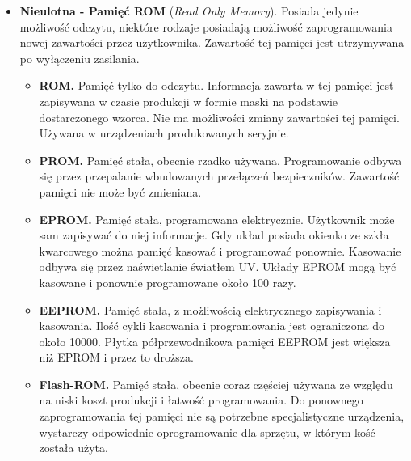 \documentclass[12pt,a4paper]{article}
\begin{document}
		\begin{itemize}
		\item \textbf{Nieulotna - Pamięć ROM} (\textit{Read Only Memory}). Posiada jedynie możliwość odczytu, niektóre rodzaje posiadają możliwość zaprogramowania nowej zawartości przez użytkownika. Zawartość tej pamięci jest utrzymywana po wyłączeniu zasilania. 
		\begin{itemize}
			\item \textbf{ROM.} Pamięć tylko do odczytu. Informacja zawarta w tej pamięci jest zapisywana w czasie produkcji w formie maski na podstawie dostarczonego wzorca. Nie ma możliwości zmiany zawartości tej pamięci. Używana w urządzeniach produkowanych seryjnie. 
			\item \textbf{PROM.} Pamięć stała, obecnie rzadko używana. Programowanie odbywa się przez przepalanie wbudowanych przełączeń bezpieczników. Zawartość pamięci nie może być zmieniana. 
			\item \textbf{EPROM.} Pamięć stała, programowana elektrycznie. Użytkownik może sam zapisywać do niej informacje. Gdy układ posiada okienko ze szkła kwarcowego można pamięć kasować i programować ponownie. Kasowanie odbywa się przez naświetlanie światłem UV. Układy EPROM mogą być kasowane i ponownie programowane około 100 razy. 
			\item \textbf{EEPROM.} Pamięć stała, z możliwością elektrycznego zapisywania i kasowania. Ilość cykli kasowania i programowania jest ograniczona do około 10000. Płytka półprzewodnikowa pamięci EEPROM jest większa niż EPROM i przez to droższa. 
			\item \textbf{Flash-ROM.} Pamięć stała, obecnie coraz częściej używana ze względu na niski koszt produkcji i łatwość programowania. Do ponownego zaprogramowania tej pamięci nie są potrzebne specjalistyczne urządzenia, wystarczy odpowiednie oprogramowanie dla sprzętu, w którym kość została użyta.
		\end{itemize}
	\end{itemize}
	
\end{document}
